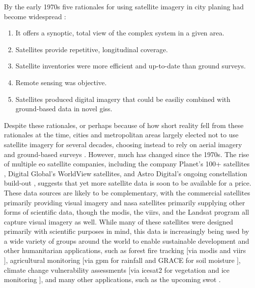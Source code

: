 \documentclass[notitlepage]{article}
\begin{document}
By the early 1970s five rationales for using satellite imagery in city planing had become widespread \cite{lightWarfareWelfareDefense2005}:

\begin{enumerate}[itemsep=0pt,parsep=0pt]
	\item{It offers a synoptic, total view of the complex system in a given area.}
	\item{Satellites provide repetitive, longitudinal coverage.}
	\item{Satellite inventories were more efficient and up-to-date than ground surveys.}
	\item{Remote sensing was objective.}
	\item{Satellites produced digital imagery that could be easiliy combined with ground-based data in novel \acp{gis}.}
\end{enumerate}

Despite these rationales, or perhaps because of how short reality fell from these rationales at the time, cities and metropolitan areas largely elected not to use satellite imagery for several decades, choosing instead to rely on aerial imagery and ground-based surveys \cite{lightWarfareWelfareDefense2005}. However, much has changed since the 1970s. The rise of multiple \ac{eo} satellite companies, including the company Planet's 100+ satellites \cite{tepperSatelliteMakerPlanet2015}, Digital Global's WorldView satellites, and Astro Digital’s ongoing constellation build-out \cite{shieberAstroDigitalLaunched2017}, suggests that yet more satellite data is soon to be available for a price. These data sources are likely to be complementary, with the commercial satellites primarily providing visual imagery and \ac{nasa} satellites primarily supplying other forms of scientific data, though the \ac{modis}, the \ac{viirs}, and the Landsat program all capture visual imagery as well. While many of these satellites were designed primarily with scientific purposes in mind, this data is increasingly being used by a wide variety of groups around the world to enable sustainable development and other humanitarian applications, such as  forest fire tracking [via \ac{modis} and \ac{viirs} \cite{schroederNewVIIRS375m2014}], agricultural monitoring [via \ac{gpm} for rainfall \cite{houGlobalPrecipitationMeasurement2014} and GRACE for soil moisture \cite{wahrTimevariableGravityGRACE2004}], climate change vulnerability assessments [via \ac{icesat2} for vegetation and ice monitoring \cite{mcgillMultipleAltimeterBeam2013}], and many other applications, such as the upcoming \ac{swot} \cite{biancamariaSWOTMissionIts2016}.
\end{document}
